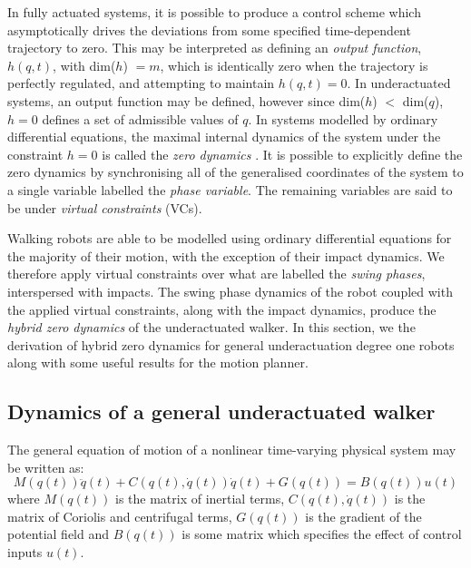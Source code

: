 In fully actuated systems, it is possible to produce a control scheme which asymptotically drives the deviations from some specified time-dependent trajectory to zero. This may be interpreted as defining an \textit{output function}, $h(q,t)$, with dim($h$) $= m$, which is identically zero when the trajectory is perfectly regulated, and attempting to maintain $h(q,t) = 0$. In underactuated systems, an output function may be defined, however since dim($h$) $<$ dim($q$), $h = 0$ defines a set of admissible values of $q$. In systems modelled by ordinary differential equations, the maximal internal dynamics of the system under the constraint $h=0$ is called the \textit{zero dynamics} \cite{isidori1995nonlinear}. It is possible to explicitly define the zero dynamics by synchronising all of the generalised coordinates of the system to a single variable labelled the \textit{phase variable}. The remaining variables are said to be under \textit{virtual constraints} (VCs). %

Walking robots are able to be modelled using ordinary differential equations for the majority of their motion, with the exception of their impact dynamics. We therefore apply virtual constraints over what are labelled the \textit{swing phases}, interspersed with impacts. The swing phase dynamics of the robot coupled with the applied virtual constraints, along with the impact dynamics, produce the \textit{hybrid zero dynamics} of the underactuated walker. In this section, we the derivation of hybrid zero dynamics for general underactuation degree one robots along with some useful results for the motion planner.

\subsection{Dynamics of a general underactuated walker}
The general equation of motion of a nonlinear time-varying physical system may be written as:
\begin{equation}\label{eqn:dynamics}
	M\left(q(t)\right)\ddot{q}(t) + C\left(q(t),\dot{q}(t)\right)\dot{q}(t)
	 + G\left(q(t)\right) = B\left(q(t)\right)u(t)
\end{equation}
where $M\left(q(t)\right)$ is the matrix of inertial terms, $C\left(q(t),\dot{q}(t)\right)$ is the matrix of Coriolis and centrifugal terms, $G\left(q(t)\right)$ is the gradient of the potential field and $B\left(q(t)\right)$ is some matrix which specifies the effect of control inputs $u(t)$. 

